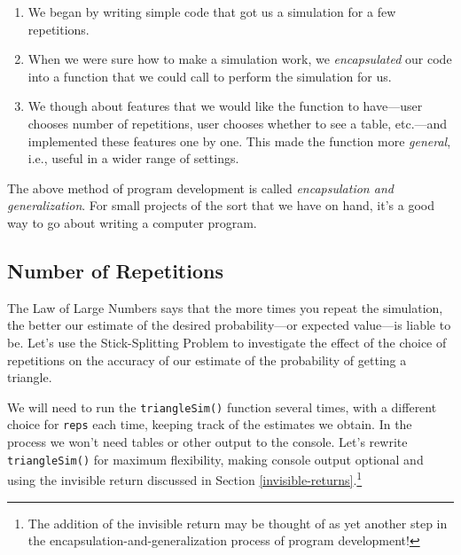 \documentclass[]{book}
\providecommand{\tightlist}{%
  \setlength{\itemsep}{0pt}\setlength{\parskip}{0pt}}
\let\rmarkdownfootnote\footnote%
\def\footnote{\protect\rmarkdownfootnote}
\theoremstyle{definition}
\theoremstyle{definition}
\theoremstyle{definition}
\theoremstyle{remark}
\begin{document}
{\begin{enumerate}
\def\labelenumi{\arabic{enumi}.}
\tightlist
\item
  We began by writing simple code that got us a simulation for a few
  repetitions.
\item
  When we were sure how to make a simulation work, we
  \emph{encapsulated} our code into a function that we could call to
  perform the simulation for us.
\item
  We though about features that we would like the function to
  have---user chooses number of repetitions, user chooses whether to see
  a table, etc.---and implemented these features one by one. This made
  the function more \emph{general}, i.e., useful in a wider range of
  settings.
\end{enumerate}

The above method of program development is called \emph{encapsulation
and generalization}. For small projects of the sort that we have on
hand, it's a good way to go about writing a computer program.

\subsection{Number of Repetitions}\label{number-of-repetitions}

The Law of Large Numbers says that the more times you repeat the
simulation, the better our estimate of the desired probability---or
expected value---is liable to be. Let's use the Stick-Splitting Problem
to investigate the effect of the choice of repetitions on the accuracy
of our estimate of the probability of getting a triangle.

We will need to run the \texttt{triangleSim()} function several times,
with a different choice for \texttt{reps} each time, keeping track of
the estimates we obtain. In the process we won't need tables or other
output to the console. Let's rewrite \texttt{triangleSim()} for maximum
flexibility, making console output optional and using the invisible
return discussed in Section \ref{invisible-returns}.\footnote{The
  addition of the invisible return may be thought of as yet another step
  in the encapsulation-and-generalization process of program
  development!}

}
\end{document}
